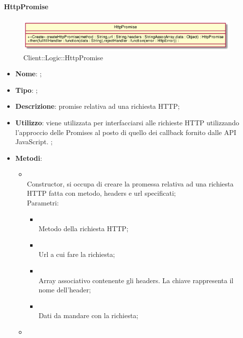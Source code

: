 \hypertarget{HttpPromise_label}{\paragraph{HttpPromise}}
\begin{figure}[h]
	\centering
	\includegraphics[width=\textwidth,height=\textheight,keepaspectratio]{images/ClassHttpPromise.png}
	\caption{Client::Logic::HttpPromise}
\end{figure}
\begin{itemize}
	\item \textbf{Nome}: ;
	\item \textbf{Tipo}: ;
	\item \textbf{Descrizione}: promise relativa ad una richiesta HTTP;
	\item \textbf{Utilizzo}: viene utilizzata per interfacciarsi alle richieste HTTP utilizzando l'approccio delle Promises al posto di quello dei callback fornito dalle API JavaScript. ;
	\item \textbf{Metodi}:
	\begin{itemize}
		\item[]  \\
		Constructor, si occupa di creare la promessa relativa ad una richiesta HTTP fatta con metodo, headers e url specificati;\\
		Parametri:
		\begin{itemize}
			\item {} \\
			Metodo della richiesta HTTP;
			\item {} \\
			Url a cui fare la richiesta;
			\item {} \\
			Array associativo contenente gli headers. La chiave rappresenta il nome dell'header;
			\item {} \\
			Dati da mandare con la richiesta;
		\end{itemize}
		\item[]  \\

\end{itemize}
\end{itemize}
